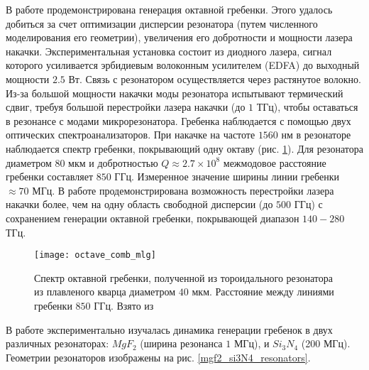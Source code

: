 В работе \cite{octave_comb_2011} продемонстрирована генерация октавной гребенки. Этого удалось добиться за счет оптимизации дисперсии резонатора (путем численного моделирования его геометрии), увеличения его добротности и мощности лазера накачки. Экспериментальная установка состоит из диодного лазера, сигнал которого усиливается эрбидиевым волоконным усилителем (EDFA) до выходный мощности $2.5$ Вт. Связь с резонатором осуществляется через растянутое волокно. Из-за большой мощности накачки моды резонатора испытывают термический сдвиг, требуя большой перестройки лазера накачки (до $1$ ТГц), чтобы оставаться в резонансе с модами микрорезонатора. Гребенка наблюдается с помощью двух оптических спектроанализаторов. При накачке на частоте $1560$ нм в резонаторе наблюдается спектр гребенки, покрывающий одну октаву (рис. \ref{octave_comb_mlg}). Для резонатора диаметром $80$ мкм и добротностью $Q\approx2.7\times10^8$ межмодовое расстояние гребенки составляет $850$ ГГц. Измеренное значение ширины линии гребенки $\approx 70$ МГц. В работе продемонстрирована возможность перестройки лазера накачки более, чем на одну область свободной дисперсии (до $500$ ГГц) с сохранением генерации октавной гребенки, покрывающей диапазон $140-280$ ТГц.
\begin{figure}
  \texttt{[image: octave\_comb\_mlg]}
  \caption{Спектр октавной гребенки, полученной из тороидального резонатора из плавленого кварца диаметром $40$ мкм. Расстояние между линиями гребенки $850$ ГГц. Взято из \cite{octave_comb_2011}}
  \label{octave_comb_mlg}
\end{figure}


В работе \cite{MLG_nature_2012} экспериментально изучалась динамика генерации гребенок в двух различных резонаторах: $MgF_2$ (ширина резонанса $1$ МГц), и $Si_3N_4$ (200 МГц). Геометрии резонаторов изображены на рис. \ref{mgf2_si3N4_resonators}.

